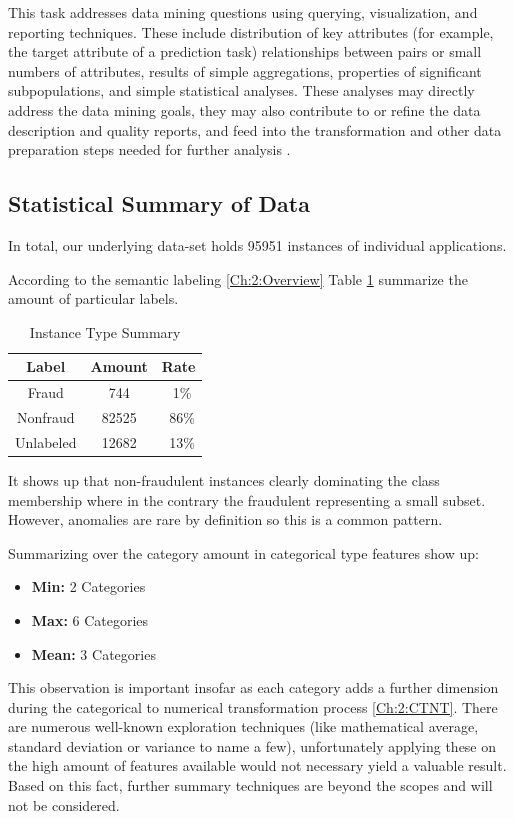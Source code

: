 This task addresses data mining questions using querying, visualization, and reporting techniques. These include distribution of key attributes (for example, the target attribute of a prediction task) relationships between pairs or small numbers of attributes, results of simple aggregations, properties of significant subpopulations, and simple statistical analyses. These analyses may directly address the data mining goals, they may also contribute to or refine the data description and quality reports, and feed into the transformation and other data preparation steps needed for further analysis \cite{crisp}.

\subsection{Statistical Summary of Data}\label{Ch:2:SSummary}

In total, our underlying data-set holds 95951 instances of individual applications.

According to the semantic labeling \ref{Ch:2:Overview} Table \ref{tab:instance-summary} summarize the amount of particular labels.

\begin{table}[h!]
  \begin{center}
    \caption{Instance Type Summary}
    \label{tab:instance-summary}
    \begin{tabular}{c|c|c}
    Label & Amount & Rate \\
      \hline
     Fraud & 744 & ~1\% \\ 
     \hline
     Nonfraud & 82525 &  ~86\% \\
     \hline
     Unlabeled & 12682 &  ~13\% \\
     \hline
    \end{tabular}
  \end{center}
\end{table}
It shows up that non-fraudulent instances clearly dominating the class membership where in the contrary the fraudulent representing a small subset. However, anomalies are rare by definition so this is a common pattern.

Summarizing over the category amount in categorical type features show up: 
\begin{itemize}
    \item \textbf{Min: } 2 Categories
    \item \textbf{Max: } 6 Categories
    \item \textbf{Mean:} 3 Categories
\end{itemize}
This observation is important insofar as each category adds a further dimension during the categorical to numerical transformation process \ref{Ch:2:CTNT}.
There are numerous well-known exploration techniques (like mathematical average, standard deviation or variance to name a few), unfortunately applying these on the high amount of features available would not necessary yield a valuable result. Based on this fact, further summary techniques are beyond the scopes and will not be considered.
